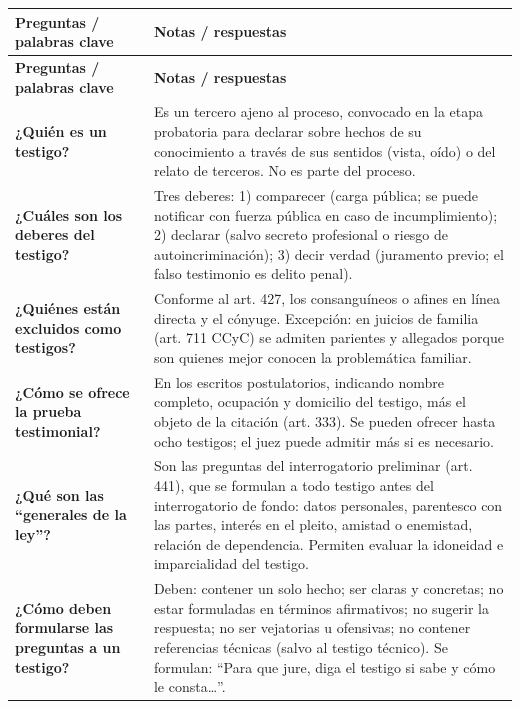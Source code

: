 \documentclass[12pt,oneside]{book}
\begin{document}
\begin{longtable}{
    >{\raggedright\arraybackslash}p{}
    >{\raggedright\arraybackslash}p{}
}
\toprule
\textbf{Preguntas / palabras clave} & \textbf{Notas / respuestas} \\
\midrule
\endfirsthead
\toprule
\textbf{Preguntas / palabras clave} & \textbf{Notas / respuestas} \\
\midrule
\endhead

\textbf{¿Quién es un testigo?} &
Es un tercero ajeno al proceso, convocado en la etapa probatoria para declarar sobre hechos de su conocimiento a través de sus sentidos (vista, oído) o del relato de terceros. No es parte del proceso. \\

\textbf{¿Cuáles son los deberes del testigo?} &
Tres deberes: 1) comparecer (carga pública; se puede notificar con fuerza pública en caso de incumplimiento); 2) declarar (salvo secreto profesional o riesgo de autoincriminación); 3) decir verdad (juramento previo; el falso testimonio es delito penal). \\

\textbf{¿Quiénes están excluidos como testigos?} &
Conforme al art. 427, los consanguíneos o afines en línea directa y el cónyuge. Excepción: en juicios de familia (art. 711 CCyC) se admiten parientes y allegados porque son quienes mejor conocen la problemática familiar. \\

\textbf{¿Cómo se ofrece la prueba testimonial?} &
En los escritos postulatorios, indicando nombre completo, ocupación y domicilio del testigo, más el objeto de la citación (art. 333). Se pueden ofrecer hasta ocho testigos; el juez puede admitir más si es necesario. \\

\textbf{¿Qué son las ``generales de la ley''?} &
Son las preguntas del interrogatorio preliminar (art. 441), que se formulan a todo testigo antes del interrogatorio de fondo: datos personales, parentesco con las partes, interés en el pleito, amistad o enemistad, relación de dependencia. Permiten evaluar la idoneidad e imparcialidad del testigo. \\

\textbf{¿Cómo deben formularse las preguntas a un testigo?} &
Deben: contener un solo hecho; ser claras y concretas; no estar formuladas en términos afirmativos; no sugerir la respuesta; no ser vejatorias u ofensivas; no contener referencias técnicas (salvo al testigo técnico). Se formulan: ``Para que jure, diga el testigo si sabe y cómo le consta\ldots''. \\


\end{longtable}
\end{document}
